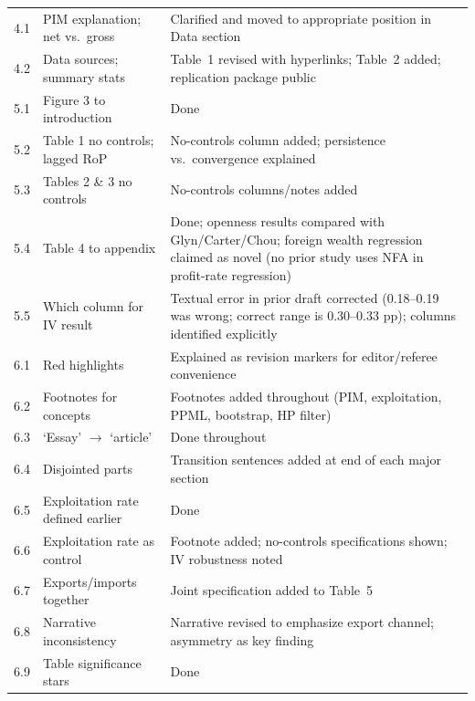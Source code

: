 \documentclass[11pt]{article}
\begin{document}
\begin{longtable}{@{}p{}p{}p{}@{}}
4.1 & PIM explanation; net vs.\ gross & Clarified and moved to appropriate position in Data section \\
4.2 & Data sources; summary stats & Table~1 revised with hyperlinks; Table~2 added; replication package public \\
5.1 & Figure 3 to introduction & Done \\
5.2 & Table 1 no controls; lagged RoP & No-controls column added; persistence vs.\ convergence explained \\
5.3 & Tables 2 \& 3 no controls & No-controls columns/notes added \\
5.4 & Table 4 to appendix & Done; openness results compared with Glyn/Carter/Chou; foreign wealth regression claimed as novel (no prior study uses NFA in profit-rate regression) \\
5.5 & Which column for IV result & Textual error in prior draft corrected (0.18--0.19 was wrong; correct range is 0.30--0.33 pp); columns identified explicitly \\
6.1 & Red highlights & Explained as revision markers for editor/referee convenience \\
6.2 & Footnotes for concepts & Footnotes added throughout (PIM, exploitation, PPML, bootstrap, HP filter) \\
6.3 & `Essay' $\to$ `article' & Done throughout \\
6.4 & Disjointed parts & Transition sentences added at end of each major section \\
6.5 & Exploitation rate defined earlier & Done \\
6.6 & Exploitation rate as control & Footnote added; no-controls specifications shown; IV robustness noted \\
6.7 & Exports/imports together & Joint specification added to Table~5 \\
6.8 & Narrative inconsistency & Narrative revised to emphasize export channel; asymmetry as key finding \\
6.9 & Table significance stars & Done \\
\bottomrule
\end{longtable}
\end{document}
